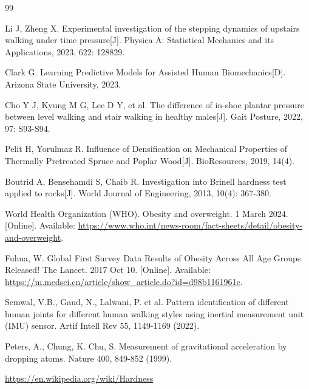 \documentclass[11pt,a4paper]{ctexart}
\begin{document}
\begin{thebibliography}{99}
\setlength{\itemsep}{0pt}

 Li J, Zheng X. Experimental investigation of the stepping dynamics of upstairs walking under time pressure[J]. Physica A: Statistical Mechanics and its Applications, 2023, 622: 128829.

 Clark G. Learning Predictive Models for Assisted Human Biomechanics[D]. Arizona State University, 2023.

 Cho Y J, Kyung M G, Lee D Y, et al. The difference of in-shoe plantar pressure between level walking and stair walking in healthy males[J]. Gait Posture, 2022, 97: S93-S94.

 Pelit H, Yorulmaz R. Influence of Densification on Mechanical Properties of Thermally Pretreated Spruce and Poplar Wood[J]. BioResources, 2019, 14(4).

 Boutrid A, Bensehamdi S, Chaib R. Investigation into Brinell hardness test applied to rocks[J]. World Journal of Engineering, 2013, 10(4): 367-380.

 World Health Organization (WHO). Obesity and overweight. 1 March 2024. [Online]. Available: \url{https://www.who.int/news-room/fact-sheets/detail/obesity-and-overweight}.

 Fuhua, W. Global First Survey Data Results of Obesity Across All Age Groups Released! The Lancet. 2017 Oct 10. [Online]. Available: \url{https://m.medsci.cn/article/show_article.do?id=d98b1161961c}.

 Semwal, V.B., Gaud, N., Lalwani, P. et al. Pattern identification of different human joints for different human walking styles using inertial measurement unit (IMU) sensor. Artif Intell Rev 55, 1149-1169 (2022).

 Peters, A., Chung, K. Chu, S. Measurement of gravitational acceleration by dropping atoms. Nature 400, 849-852 (1999).

 \url{https://en.wikipedia.org/wiki/Hardness}

\end{thebibliography}
\end{document}
